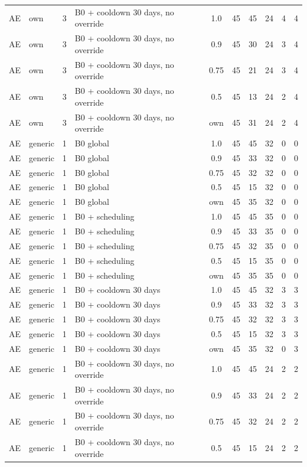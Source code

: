 \begin{longtable}{lllp{4.4cm}cccccc}
AE & own & 3 & B0 + cooldown 30 days, no override & 1.0 & 45 & 45 & 24 & 4 & 4 \\
AE & own & 3 & B0 + cooldown 30 days, no override & 0.9 & 45 & 30 & 24 & 3 & 4 \\
AE & own & 3 & B0 + cooldown 30 days, no override & 0.75 & 45 & 21 & 24 & 3 & 4 \\
AE & own & 3 & B0 + cooldown 30 days, no override & 0.5 & 45 & 13 & 24 & 2 & 4 \\
AE & own & 3 & B0 + cooldown 30 days, no override & own & 45 & 31 & 24 & 2 & 4 \\
AE & generic & 1 & B0 global & 1.0 & 45 & 45 & 32 & 0 & 0 \\
AE & generic & 1 & B0 global & 0.9 & 45 & 33 & 32 & 0 & 0 \\
AE & generic & 1 & B0 global & 0.75 & 45 & 32 & 32 & 0 & 0 \\
AE & generic & 1 & B0 global & 0.5 & 45 & 15 & 32 & 0 & 0 \\
AE & generic & 1 & B0 global & own & 45 & 35 & 32 & 0 & 0 \\
AE & generic & 1 & B0 + scheduling & 1.0 & 45 & 45 & 35 & 0 & 0 \\
AE & generic & 1 & B0 + scheduling & 0.9 & 45 & 33 & 35 & 0 & 0 \\
AE & generic & 1 & B0 + scheduling & 0.75 & 45 & 32 & 35 & 0 & 0 \\
AE & generic & 1 & B0 + scheduling & 0.5 & 45 & 15 & 35 & 0 & 0 \\
AE & generic & 1 & B0 + scheduling & own & 45 & 35 & 35 & 0 & 0 \\
AE & generic & 1 & B0 + cooldown 30 days & 1.0 & 45 & 45 & 32 & 3 & 3 \\
AE & generic & 1 & B0 + cooldown 30 days & 0.9 & 45 & 33 & 32 & 3 & 3 \\
AE & generic & 1 & B0 + cooldown 30 days & 0.75 & 45 & 32 & 32 & 3 & 3 \\
AE & generic & 1 & B0 + cooldown 30 days & 0.5 & 45 & 15 & 32 & 3 & 3 \\
AE & generic & 1 & B0 + cooldown 30 days & own & 45 & 35 & 32 & 0 & 3 \\
AE & generic & 1 & B0 + cooldown 30 days, no override & 1.0 & 45 & 45 & 24 & 2 & 2 \\
AE & generic & 1 & B0 + cooldown 30 days, no override & 0.9 & 45 & 33 & 24 & 2 & 2 \\
AE & generic & 1 & B0 + cooldown 30 days, no override & 0.75 & 45 & 32 & 24 & 2 & 2 \\
AE & generic & 1 & B0 + cooldown 30 days, no override & 0.5 & 45 & 15 & 24 & 2 & 2 \\

\end{longtable}

